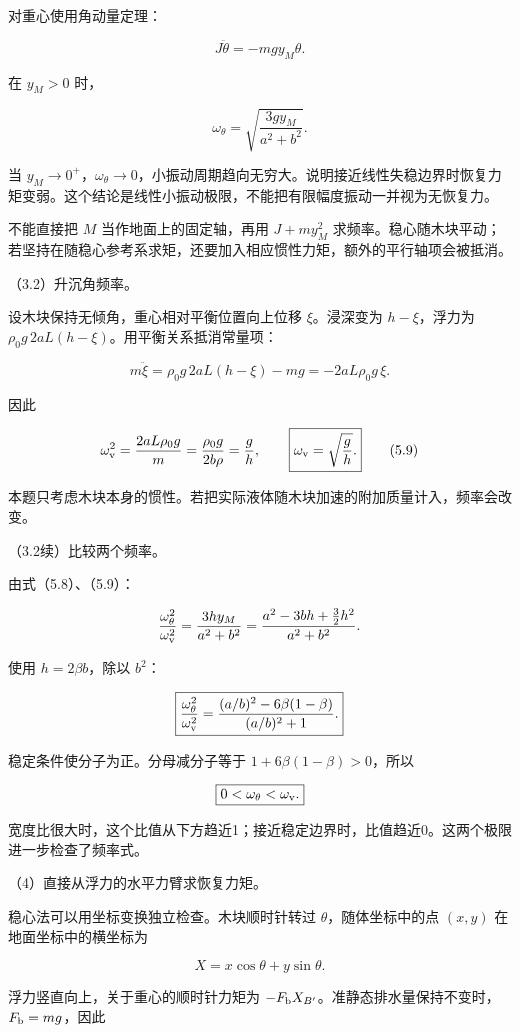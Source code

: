 \documentclass[12pt,a4paper,fontset=fandol]{ctexart}
\begin{document}
对重心使用角动量定理：

\[
J\ddot\theta=-mgy_M\theta.
\]

在 \(y_M>0\) 时，

\[
\boxed{\omega_\theta=\sqrt{\frac{3gy_M}{a^2+b^2}}.}
\tag{5.8}
\]

当
\(y_M\to0^+\)，\(\omega_\theta\to0\)，小振动周期趋向无穷大。说明接近线性失稳边界时恢复力矩变弱。这个结论是线性小振动极限，不能把有限幅度振动一并视为无恢复力。

不能直接把 \(M\) 当作地面上的固定轴，再用 \(J+my_M^2\)
求频率。稳心随木块平动；若坚持在随稳心参考系求矩，还要加入相应惯性力矩，额外的平行轴项会被抵消。

（3.2）升沉角频率。

设木块保持无倾角，重心相对平衡位置向上位移 \(\xi\)。浸深变为
\(h-\xi\)，浮力为 \(\rho_0g\,2aL(h-\xi)\)。用平衡关系抵消常量项：

\[
m\ddot\xi=\rho_0g\,2aL(h-\xi)-mg
=-2aL\rho_0g\,\xi.
\]

因此

\[
\omega_{\rm v}^2=\frac{2aL\rho_0g}{m}
=\frac{\rho_0g}{2b\rho}=\frac gh,
\qquad
\boxed{\omega_{\rm v}=\sqrt{\frac gh}.}
\tag{5.9}
\]

本题只考虑木块本身的惯性。若把实际液体随木块加速的附加质量计入，频率会改变。

（3.2续）比较两个频率。

由式（5.8）、（5.9）：

\[
\frac{\omega_\theta^2}{\omega_{\rm v}^2}
=\frac{3hy_M}{a^2+b^2}
=\frac{a^2-3bh+\frac32h^2}{a^2+b^2}.
\]

使用 \(h=2\beta b\)，除以 \(b^2\)：

\[
\boxed{\frac{\omega_\theta^2}{\omega_{\rm v}^2}
=\frac{(a/b)^2-6\beta(1-\beta)}{(a/b)^2+1}.}
\]

稳定条件使分子为正。分母减分子等于 \(1+6\beta(1-\beta)>0\)，所以

\[
\boxed{0<\omega_\theta<\omega_{\rm v}.}
\]

宽度比很大时，这个比值从下方趋近1；接近稳定边界时，比值趋近0。这两个极限进一步检查了频率式。

（4）直接从浮力的水平力臂求恢复力矩。

稳心法可以用坐标变换独立检查。木块顺时针转过 \(\theta\)，随体坐标中的点
\((x,y)\) 在地面坐标中的横坐标为

\[
X=x\cos\theta+y\sin\theta.
\]

浮力竖直向上，关于重心的顺时针力矩为
\(-F_{\rm b}X_{B'}\)。准静态排水量保持不变时，\(F_{\rm b}=mg\)，因此
\end{document}

